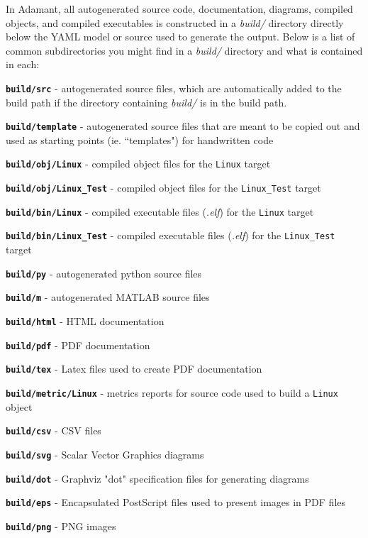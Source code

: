 In Adamant, all autogenerated source code, documentation, diagrams, compiled objects, and compiled executables is constructed in a \textit{build/} directory directly below the YAML model or source used to generate the output. Below is a list of common subdirectories you might find in a \textit{build/} directory and what is contained in each:

\vspace{5mm} %
\begin{spaceditemize}
  \item \textbf{\texttt{build/src}} - autogenerated source files, which are automatically added to the build path if the directory containing \textit{build/} is in the build path.
  \item \textbf{\texttt{build/template}} - autogenerated source files that are meant to be copied out and used as starting points (ie. ``templates") for handwritten code
  \item \textbf{\texttt{build/obj/Linux}} - compiled object files for the \texttt{Linux} target
  \item \textbf{\texttt{build/obj/Linux\_Test}} - compiled object files for the \texttt{Linux\_Test} target
  \item \textbf{\texttt{build/bin/Linux}} - compiled executable files (\textit{.elf}) for the \texttt{Linux} target
  \item \textbf{\texttt{build/bin/Linux\_Test}} - compiled executable files (\textit{.elf}) for the \texttt{Linux\_Test} target
  \item \textbf{\texttt{build/py}} - autogenerated python source files
  \item \textbf{\texttt{build/m}} - autogenerated MATLAB source files
  \item \textbf{\texttt{build/html}} - HTML documentation
  \item \textbf{\texttt{build/pdf}} - PDF documentation
  \item \textbf{\texttt{build/tex}} - Latex files used to create PDF documentation
  \item \textbf{\texttt{build/metric/Linux}} - metrics reports for source code used to build a \texttt{Linux} object
  \item \textbf{\texttt{build/csv}} - CSV files
  \item \textbf{\texttt{build/svg}} - Scalar Vector Graphics diagrams
  \item \textbf{\texttt{build/dot}} - Graphviz "dot" specification files for generating diagrams
  \item \textbf{\texttt{build/eps}} - Encapsulated PostScript files used to present images in PDF files
  \item \textbf{\texttt{build/png}} - PNG images
\end{spaceditemize}
\vspace{5mm} %

